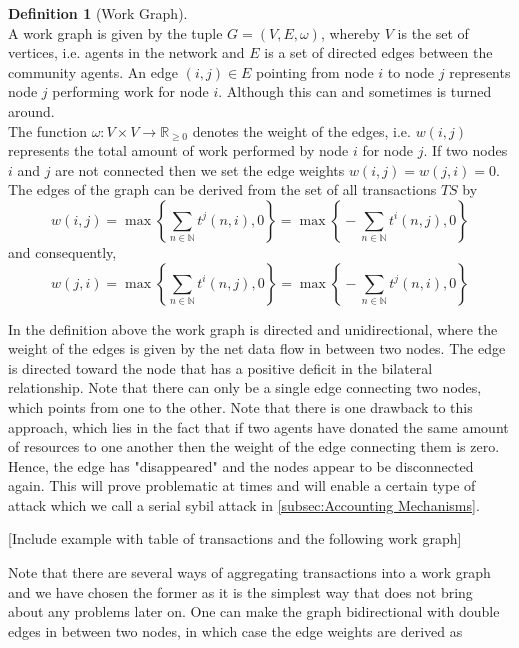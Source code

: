 \documentclass[11pt,a4paper]{report}
\theoremstyle{definition}
\newtheorem{definition}{Definition}[section]
\theoremstyle{theorem}
\theoremstyle{proposition}
\theoremstyle{corollary}
\theoremstyle{lemma}
\theoremstyle{example}
\theoremstyle{remark}
\begin{document}
\begin{definition}[Work Graph]\ \\
A work graph is given by the tuple $G = (V, E, \omega)$, whereby $V$ is the set of vertices, i.e. agents in the network and $E$ is a set of directed edges between the community agents. An edge $(i,j)\in{}E$ pointing from node $i$ to node $j$ represents node $j$ performing work for node $i$. Although this can and sometimes is turned around.\\ The function $\omega:V\times{}V\rightarrow{}\mathbb{R}_{\geq{}0}$ denotes the weight of the edges, i.e. $w(i,j)$ represents the total amount of work performed by node $i$ for node $j$. If two nodes $i$ and $j$ are not connected then we set the edge weights $w(i,j)=w(j,i)=0$. The edges of the graph can be derived from the set of all transactions $TS$ by
\[
w(i,j) = \max\left\lbrace{}\sum\limits_{n\in\mathbb{N}}t^j(n,i), 0\right\rbrace = \max\left\lbrace{}-\sum\limits_{n\in\mathbb{N}}t^i(n,j), 0\right\rbrace
\]
and consequently, 
\[
w(j,i) = \max\left\lbrace{}\sum\limits_{n\in\mathbb{N}}t^i(n,j), 0\right\rbrace = \max\left\lbrace{}-\sum\limits_{n\in\mathbb{N}}t^j(n,i), 0\right\rbrace
\]
\end{definition}

\noindent{}In the definition above the work graph is directed and unidirectional, where the weight of the edges is given by the net data flow in between two nodes. The edge is directed toward the node that has a positive deficit in the bilateral relationship. Note that there can only be a single edge connecting two nodes, which points from one to the other. Note that there is one drawback to this approach, which lies in the fact that if two agents have donated the same amount of resources to one another then the weight of the edge connecting them is zero. Hence, the edge has "disappeared" and the nodes appear to be disconnected again. This will prove problematic at times and will enable a certain type of attack which we call a serial sybil attack in \ref{subsec:Accounting Mechanisms}. \vspace{1em}\\

\begin{center} [Include example with table of transactions and the following work graph] \vspace{1em}\\ \end{center}

\noindent{}Note that there are several ways of aggregating transactions into a work graph and we have chosen the former as it is the simplest way that does not bring about any problems later on. One can make the graph bidirectional with double edges in between two nodes, in which case the edge weights are derived as 
\end{document}
